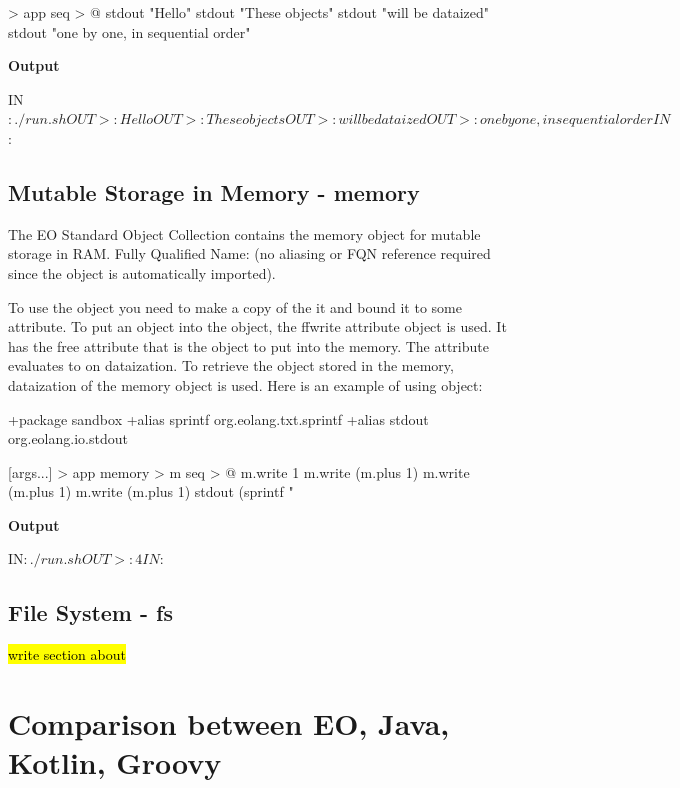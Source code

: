 \documentclass[12pt]{book}
\begin{document}
{{{\begin{ffcode}
[args...] > app
  seq > @
    stdout "Hello\n"
    stdout "These objects\n"
    stdout "will be dataized\n"
    stdout "one by one, in sequential order\n"
\end{ffcode}
\textbf{Output}
\begin{ffcode}
IN$: ./run.sh
OUT>: Hello
OUT>: These objects
OUT>: will be dataized
OUT>: one by one, in sequential order
IN$:
\end{ffcode}

\section{Mutable Storage in Memory - memory}
The EO Standard Object Collection contains the memory object for mutable storage in RAM.
Fully Qualified Name:  (no aliasing or FQN reference required since the object is automatically imported).

To use the  object you need to make a copy of the it and bound it to some attribute.
To put an object into the  object, the
ff{write} attribute object is used. It has the  free attribute that is the object to put into the memory. The  attribute evaluates to  on dataization.
To retrieve the object stored in the memory, dataization of the memory object is used. Here is an example of using  object:

\begin{ffcode}
+package sandbox
+alias sprintf org.eolang.txt.sprintf
+alias stdout org.eolang.io.stdout

[args...] > app
  memory > m
  seq > @
    m.write 1
    m.write (m.plus 1)
    m.write (m.plus 1)
    m.write (m.plus 1)
    stdout (sprintf "%
\end{ffcode}
\textbf{Output}
\begin{ffcode}
IN$: ./run.sh
OUT>: 4
IN$:
\end{ffcode}

\section{File System - fs} \label{sec:files}

\hl{write section about} 

\chapter{Comparison between EO, Java, Kotlin, Groovy}

}}}
\end{document}
